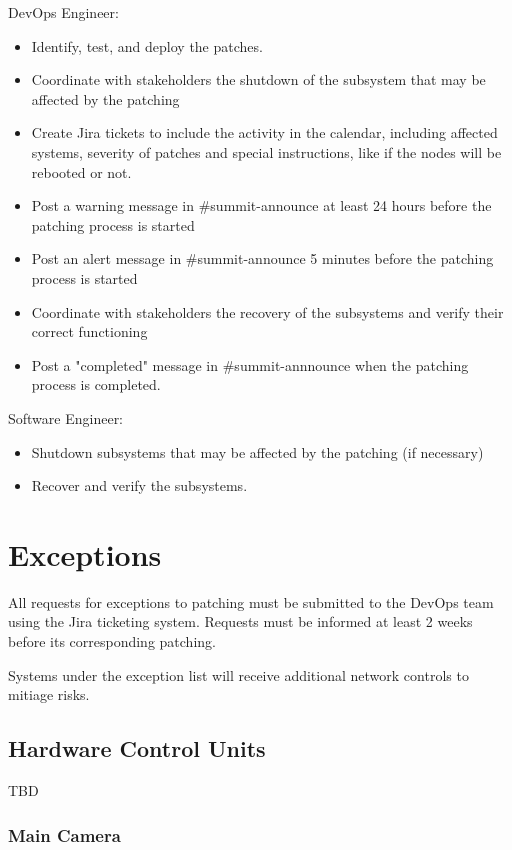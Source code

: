 DevOps Engineer:
\begin{itemize}
    \item Identify, test, and deploy the patches. 
    \item Coordinate with stakeholders the shutdown of the subsystem that may be affected by the patching
    \item Create Jira tickets to include the activity in the calendar, including affected systems, severity of patches and special instructions, like if the nodes will be rebooted or not. 
    \item Post a warning message in \#summit-announce at least 24 hours before the patching process is started
    \item Post an alert message in \#summit-announce 5 minutes before the patching process is started
    \item Coordinate with stakeholders the recovery of the subsystems and verify their correct functioning 
    \item Post a "completed" message in \#summit-annnounce when the patching process is completed. 
\end{itemize}

Software Engineer:
\begin{itemize}
    \item Shutdown subsystems that may be affected by the patching (if necessary)
    \item Recover and verify the subsystems. 
\end{itemize}

\section{Exceptions}

All requests for exceptions to patching must be submitted to the DevOps team using the Jira ticketing system. Requests must be informed at least 2 weeks before its corresponding patching. 

Systems under the exception list will receive additional network controls to mitiage risks. 

\subsection{Hardware Control Units}

TBD

\subsubsection{Main Camera}

